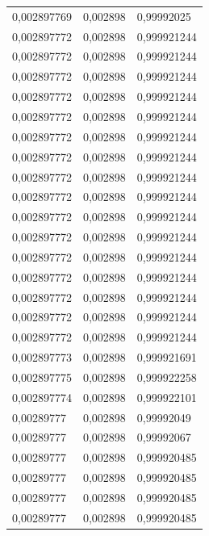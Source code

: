 \begin{center}
\begin{longtable}{|l|l|l|}
0,002897769        & 0,002898              & 0,99992025   \\
0,002897772        & 0,002898              & 0,999921244  \\
0,002897772        & 0,002898              & 0,999921244  \\
0,002897772        & 0,002898              & 0,999921244  \\
0,002897772        & 0,002898              & 0,999921244  \\
0,002897772        & 0,002898              & 0,999921244  \\
0,002897772        & 0,002898              & 0,999921244  \\
0,002897772        & 0,002898              & 0,999921244  \\
0,002897772        & 0,002898              & 0,999921244  \\
0,002897772        & 0,002898              & 0,999921244  \\
0,002897772        & 0,002898              & 0,999921244  \\
0,002897772        & 0,002898              & 0,999921244  \\
0,002897772        & 0,002898              & 0,999921244  \\
0,002897772        & 0,002898              & 0,999921244  \\
0,002897772        & 0,002898              & 0,999921244  \\
0,002897772        & 0,002898              & 0,999921244  \\
0,002897772        & 0,002898              & 0,999921244  \\
0,002897773        & 0,002898              & 0,999921691  \\
0,002897775        & 0,002898              & 0,999922258  \\
0,002897774        & 0,002898              & 0,999922101  \\
0,00289777         & 0,002898              & 0,99992049   \\
0,00289777         & 0,002898              & 0,99992067   \\
0,00289777         & 0,002898              & 0,999920485  \\
0,00289777         & 0,002898              & 0,999920485  \\
0,00289777         & 0,002898              & 0,999920485  \\
0,00289777         & 0,002898              & 0,999920485  \\

\end{longtable}
\end{center}
